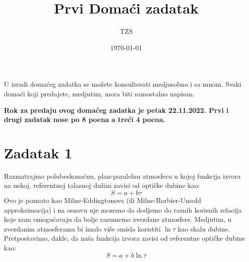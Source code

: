 \documentclass[12pt]{article}
\title{Prvi Doma\'{c}i zadatak}
\author{TZS}
\date{\today}
\begin{document}
\maketitle

U izradi doma\'{c}eg zadatka se mo\v{z}ete konsultovati medjusobno i sa mnom. Svaki doma\'{c}i koji predajete, medjutim, mora biti samostalno napisan. 

\textbf{Rok za predaju ovog doma\'{c}eg zadatka je petak 22.11.2022. Prvi i drugi zadatak nose po 8 poena a tre\'{c}i 4 poena.}

\section*{Zadatak 1}

Razmatrajmo polubeskona\v{c}nu, plan-paralelnu atmosferu u kojoj funkcija izvora na nekoj, referentnoj talasnoj du\v{z}ini zavisi od opti\v{c}ke dubine kao:
\begin{equation}
S = a + b\tau
\end{equation}
Ovo je poznato kao Milne-Eddingtonova (ili Milne-Barbier-Unsold approksimacija) i na osnovu nje mozemo da dodjemo do raznih korisnih relacija koje nam omogu\'{c}avaju da bolje razumemo zvezdane atmosfere. Medjutim, u zvezdanim atmosferama bi imalo vi\v{s}e smisla koristiti $\ln \tau$ kao skalu dubine. Pretpostavimo, dakle, da na\v{s}a funkcija izvora zavisi od referentne opti\v{c}ke dubine kao:
\begin{equation}
S = a + b\ln\tau
\end{equation}
\end{document}
